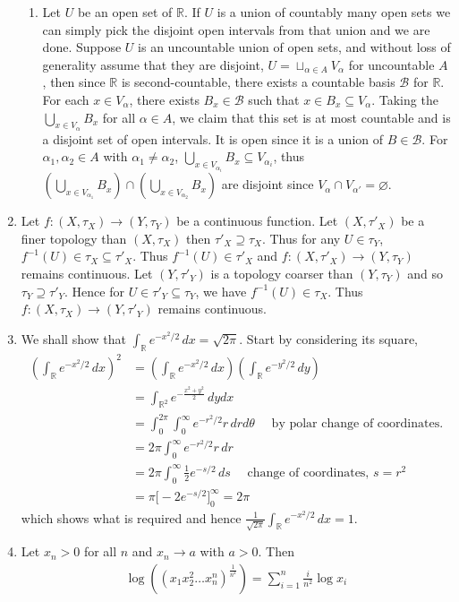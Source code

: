 \documentclass[a4paper,12pt]{article}
\theoremstyle{definition}
\begin{document}
\begin{enumerate}
\begin{enumerate}
\item Let $U$ be an open set of $\mathbb{R}$. If $U$ is a union of countably many open sets we can simply pick the disjoint open intervals from that union and we are done. Suppose $U$ is an uncountable union of open sets, and without loss of generality assume that they are disjoint, $U = \sqcup_{\alpha \in A}V_\alpha$ for uncountable $A$, then since $\mathbb{R}$ is second-countable, there exists a countable basis $\mathcal{B}$ for $\mathbb{R}$. For each $x \in V_\alpha$, there exists $B_x \in \mathcal{B}$ such that $x \in B_x \subseteq V_\alpha$. Taking the $\bigcup_{x\in V_\alpha} B_x$ for all $\alpha \in A$, we claim that this set is at most countable and is a disjoint set of open intervals. It is open since it is a union of $B \in \mathcal{B}$. 
For $\alpha_1, \alpha_2 \in A$ with $\alpha_1 \neq \alpha_2$, $\bigcup_{x\in V_{\alpha_i}} B_x\subseteq V_{\alpha_i}$,
 thus $\left(\bigcup_{x\in V_{\alpha_1}}B_x\right) \cap \left(\bigcup_{x\in V_{\alpha_2}}B_x\right)$ are disjoint since $V_{\alpha} \cap V_{\alpha'} = \varnothing$.






\end{enumerate}

\item Let $f : (X, \tau_X) \to (Y, \tau_Y)$ be a continuous function. Let $(X,\tau'_X)$ be a finer topology than $(X, \tau_X)$ then $\tau'_X \supseteq \tau_X$. Thus for any $U \in \tau_Y$, $f^{-1}(U) \in \tau_X \subseteq \tau'_X$. Thus $f^{-1}(U) \in \tau'_X$ and $f : (X, \tau'_X) \to (Y, \tau_Y)$ remains continuous. Let $(Y,\tau'_Y)$ is a topology coarser than $(Y, \tau_Y)$ and so $\tau_Y \supseteq\tau'_Y$. Hence for $U \in \tau'_Y \subseteq \tau_Y$, we have $f^{-1}(U)\in \tau_X$. Thus  $f : (X, \tau_X) \to (Y, \tau'_Y)$ remains continuous.

\item We shall show that $\int_{\mathbb{R}}e^{-x^2/2}\,dx = \sqrt{2\pi}$. Start by considering its square,
\begin{align*}
\left(\int_{\mathbb{R}}e^{-x^2/2}\,dx\right)^2 &= \left(\int_{\mathbb{R}}e^{-x^2/2}\,dx\right)\left(\int_{\mathbb{R}}e^{-y^2/2}\,dy\right)\\
&=\int_{\mathbb{R}^2}e^{-\frac{x^2+y^2}{2}}\,dydx\\
& = \int_{0}^{2\pi}\int_{0}^{\infty}e^{-r^2/2}r \,drd\theta \quad\text{   by polar change of coordinates.}\\
&= 2\pi \int_{0}^{\infty}e^{-r^2/2}r \,dr \\
&=2\pi \int_{0}^{\infty}\frac{1}{2}e^{-s/2} \,ds\quad \text{ change of coordinates, $s = r^2$}\\
&=\pi \Big[-2e^{-s/2}\Big]_{0}^{\infty} = 2\pi
\end{align*}
which shows what is required and hence $\frac{1}{\sqrt{2\pi}}\int_{\mathbb{R}}e^{-x^2/2}\,dx=1$.
\item Let $x_n >0$ for all $n$ and $x_n \to a$ with $a >0$. Then
\begin{align*}
\log \left((x_1x_2^2 \ldots x_n^n)^{\frac{1}{n^2}}\right) = \sum_{i=1}^{n}\frac{i}{n^2}\log x_i
\end{align*}


\end{enumerate}
\end{document}
